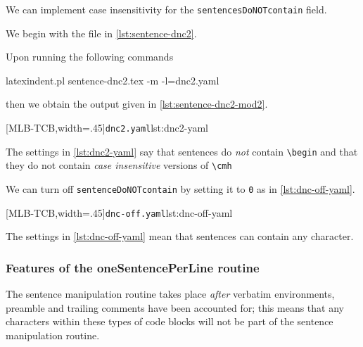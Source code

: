  \begin{example}
 We can implement case insensitivity for the \texttt{sentencesDoNOTcontain} field.

 We begin with the file in \cref{lst:sentence-dnc2}.


 Upon running the following commands

 \begin{commandshell}
latexindent.pl sentence-dnc2.tex -m -l=dnc2.yaml
\end{commandshell}

 then we obtain the output given in \cref{lst:sentence-dnc2-mod2}.

 \begin{cmhtcbraster}[ raster left skip=-2.5cm,
   raster right skip=-1cm,
   raster force size=false,
   raster column 1/.style={add to width=3cm},
  ]
  [MLB-TCB,width=.45\textwidth]{\texttt{dnc2.yaml}}{lst:dnc2-yaml}
 \end{cmhtcbraster}

 The settings in \cref{lst:dnc2-yaml} say that sentences do \emph{not} contain
 \lstinline!\begin! and that they do not contain \emph{case insensitive} versions of
 \lstinline!\cmh!
 \end{example}
 \begin{example}
 We can turn off \texttt{sentenceDoNOTcontain} by setting it to \texttt{0} as in
 \cref{lst:dnc-off-yaml}.

 [MLB-TCB,width=.45\textwidth]{\texttt{dnc-off.yaml}}{lst:dnc-off-yaml}

 The settings in \cref{lst:dnc-off-yaml} mean that sentences can contain any character.
 \end{example}

\subsubsection{Features of the oneSentencePerLine routine}
 The sentence manipulation routine takes place \emph{after} verbatim  environments, preamble and trailing comments have been
 accounted for; this means that any characters within these types of code blocks will not
 be part of the sentence manipulation routine.

